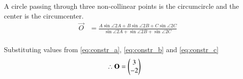 \solution A circle passing through three non-collinear points is the circumcircle and the center is the circumcenter.\\
\begin{align}
\vec{O} &= \frac{A\sin{\angle 2A} + B\sin{\angle 2B} + C\sin{\angle 2C}}{\sin{\angle 2A} + \sin{\angle 2B} + \sin{\angle 2C}}
\end{align}\\
Substituting values from \ref{eq:constr_a}, \ref{eq:constr_b} and \ref{eq:constr_c}
\begin{align}
\therefore \mathbf{O} &= \begin{pmatrix}3\\-2\end{pmatrix}
\end{align}






